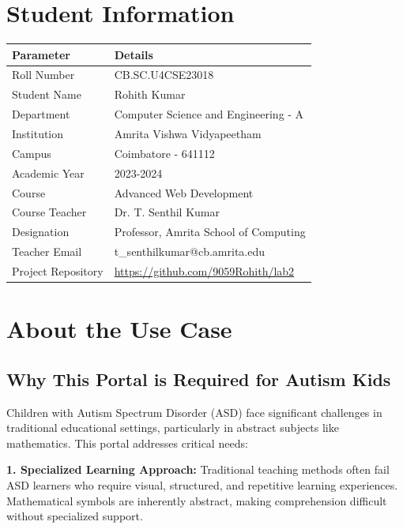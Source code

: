 \documentclass[11pt, a4paper]{article}
\begin{document}
\newpage

\section{Student Information}

\begin{table}[h]
\centering
\begin{tabular}{ll}
\toprule
\textbf{Parameter} & \textbf{Details} \\
\midrule
Roll Number & CB.SC.U4CSE23018 \\
Student Name & Rohith Kumar \\
Department & Computer Science and Engineering - A \\
Institution & Amrita Vishwa Vidyapeetham \\
Campus & Coimbatore - 641112 \\
Academic Year & 2023-2024 \\
Course & Advanced Web Development \\
Course Teacher & Dr. T. Senthil Kumar \\
Designation & Professor, Amrita School of Computing \\
Teacher Email & t\_senthilkumar@cb.amrita.edu \\
Project Repository & \url{https://github.com/9059Rohith/lab2} \\
\bottomrule
\end{tabular}
\end{table}

\vspace{0.5cm}

\section{About the Use Case}

\subsection{Why This Portal is Required for Autism Kids}

Children with Autism Spectrum Disorder (ASD) face significant challenges in traditional educational settings, particularly in abstract subjects like mathematics. This portal addresses critical needs:

\textbf{1. Specialized Learning Approach:} Traditional teaching methods often fail ASD learners who require visual, structured, and repetitive learning experiences. Mathematical symbols are inherently abstract, making comprehension difficult without specialized support.
\end{document}

